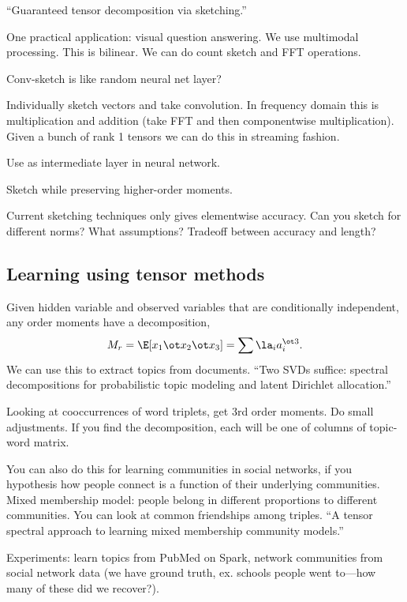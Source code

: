``Guaranteed tensor decomposition via sketching.''

One practical application: visual question answering. We use multimodal processing. This is bilinear. We can do count sketch and FFT operations.

Conv-sketch is like random neural net layer? 

Individually sketch vectors and take convolution. In frequency domain this is multiplication and addition (take FFT and then componentwise multiplication). Given a bunch of rank 1 tensors we can do this in streaming fashion.

Use as intermediate layer in neural network.

Sketch while preserving higher-order moments.

Current sketching techniques only gives elementwise accuracy. Can you sketch for different norms? What assumptions? Tradeoff between accuracy and length?


\subsection{Learning using tensor methods}

Given hidden variable and observed variables that are conditionally independent, any order moments have a decomposition,
$$
M_r = \E[x_1\ot x_2\ot x_3]=\sum \la_i a_i^{\ot3}.
$$
We can use this to extract topics from documents. ``Two SVDs suffice: spectral decompositions for probabilistic topic modeling and latent Dirichlet allocation.''

Looking at cooccurrences of word triplets, get 3rd order moments. Do small adjustments. If you find the decomposition, each will be one of columns of topic-word matrix.

You can also do this for learning communities in social networks, if you hypothesis how people connect is a function of their underlying communities. Mixed membership model: people belong in different proportions to different communities.
You can look at common friendships among triples. ``A tensor spectral approach to learning mixed membership community models.''


Experiments: learn topics from PubMed on Spark, network communities from social network data (we have ground truth, ex. schools people went to---how many of these did we recover?).


